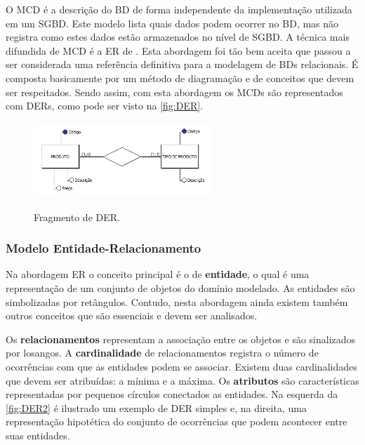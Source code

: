 O \ac{MCD} é a descrição do \ac{BD} de forma independente da implementação utilizada em um \ac{SGBD}. 
Este modelo lista quais dados podem ocorrer no \ac{BD}, mas não registra como estes dados estão armazenados no nível de \ac{SGBD}. 
A técnica mais difundida de \ac{MCD} é a \ac{ER} de . 
Esta abordagem foi tão bem aceita que passou a ser considerada uma referência definitiva para a modelagem de \acp{BD} relacionais. 
É composta basicamente por um método de diagramação e de conceitos que devem ser respeitados. 
Sendo assim, com esta abordagem os \acp{MCD} são representados com \acp{DER}, como pode ser visto na \autoref{fig:DER}.
    
\begin{figure}[htb]
	\centering
	\caption{Fragmento de DER.}
		\includegraphics[width=0.6\textwidth]{img/MCD.jpg}
	\label{fig:DER}
\end{figure}

    \subsubsection{Modelo Entidade-Relacionamento} \label{ssec:ModeloER}

Na abordagem \ac{ER} o conceito principal é o de \textbf{entidade}, o qual é uma representação de um conjunto de objetos do domínio modelado. 
As entidades são simbolizadas por retângulos. 
Contudo, nesta abordagem ainda existem também outros conceitos que são essenciais e devem ser analisados.

Os \textbf{relacionamentos} representam a associação entre os objetos e são sinalizados por losangos. 
A \textbf{cardinalidade} de relacionamentos registra o número de ocorrências com que as entidades podem se associar. 
Existem duas cardinalidades que devem ser atribuídas: a mínima e a máxima. Os \textbf{atributos} são características representadas por pequenos círculos conectados as entidades. 
Na esquerda da \autoref{fig:DER2} é ilustrado um exemplo de \ac{DER} simples e, na direita, uma representação hipotética do conjunto de ocorrências que podem acontecer entre suas entidades. 

